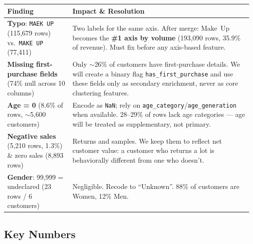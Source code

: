 \documentclass[9pt,a4paper]{article}
\begin{document}
\begin{table}[H]
\centering\footnotesize
\begin{tabularx}{\textwidth}{@{}lX@{}}
\toprule
\textbf{Finding} & \textbf{Impact \& Resolution} \\
\midrule
\textbf{Typo}: \texttt{MAEK UP} (115{,}679 rows) vs.\ \texttt{MAKE UP} (77{,}411) &
Two labels for the same axis. After merge: Make~Up becomes the \textbf{\#1 axis by volume} (193{,}090 rows, 35.9\% of revenue). Must fix before any axis-based feature. \\
\textbf{Missing first-purchase fields} (74\% null across 10 columns) &
Only $\sim$26\% of customers have first-purchase details. We will create a binary flag \texttt{has\_first\_purchase} and use these fields only as secondary enrichment, never as core clustering features. \\
\textbf{Age = 0} (8.6\% of rows, $\sim$5{,}600 customers) &
Encode as \texttt{NaN}; rely on \texttt{age\_category}/\texttt{age\_generation} when available. 28--29\% of rows lack age categories --- age will be treated as supplementary, not primary. \\
\textbf{Negative sales} (5{,}210 rows, 1.3\%) \& zero sales (8{,}893 rows) &
Returns and samples. We keep them to reflect net customer value: a customer who returns a lot is behaviorally different from one who doesn't. \\
\textbf{Gender}: 99{,}999 = undeclared (23 rows / 6 customers) &
Negligible. Recode to ``Unknown''. 88\% of customers are Women, 12\% Men. \\
\bottomrule
\end{tabularx}
\vspace{-6pt}
\end{table}

\subsection{Key Numbers}
\end{document}
